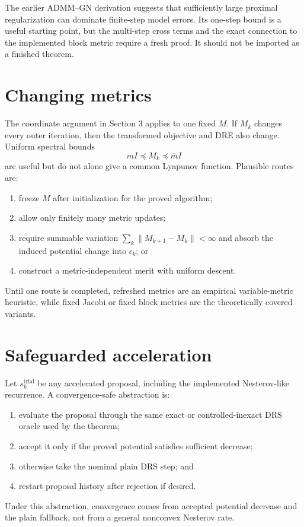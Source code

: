 \documentclass[11pt]{article}
\begin{document}
The earlier ADMM--GN derivation suggests that sufficiently large proximal
regularization can dominate finite-step model errors.  Its one-step bound is a
useful starting point, but the multi-step cross terms and the exact connection
to the implemented block metric require a fresh proof.  It should not be
imported as a finished theorem.

\section{Changing metrics}

The coordinate argument in Section 3 applies to one fixed $M$.  If $M_k$
changes every outer iteration, then the transformed objective and DRE also
change.  Uniform spectral bounds
\begin{equation}
  mI\preceq M_k\preceq \overline m I
\end{equation}
are useful but do not alone give a common Lyapunov function.  Plausible routes
are:
\begin{enumerate}
  \item freeze $M$ after initialization for the proved algorithm;
  \item allow only finitely many metric updates;
  \item require summable variation
        $\sum_k\lVert M_{k+1}-M_k\rVert<\infty$ and absorb the induced
        potential change into $\epsilon_k$; or
  \item construct a metric-independent merit with uniform descent.
\end{enumerate}
Until one route is completed, refreshed metrics are an empirical
variable-metric heuristic, while fixed Jacobi or fixed block metrics are the
theoretically covered variants.

\section{Safeguarded acceleration}

Let $s_k^{\mathrm{trial}}$ be any accelerated proposal, including the
implemented Nesterov-like recurrence.  A convergence-safe abstraction is:
\begin{enumerate}
  \item evaluate the proposal through the same exact or controlled-inexact DRS
        oracle used by the theorem;
  \item accept it only if the proved potential satisfies sufficient decrease;
  \item otherwise take the nominal plain DRS step; and
  \item restart proposal history after rejection if desired.
\end{enumerate}
Under this abstraction, convergence comes from accepted potential decrease
and the plain fallback, not from a general nonconvex Nesterov rate.
\end{document}
